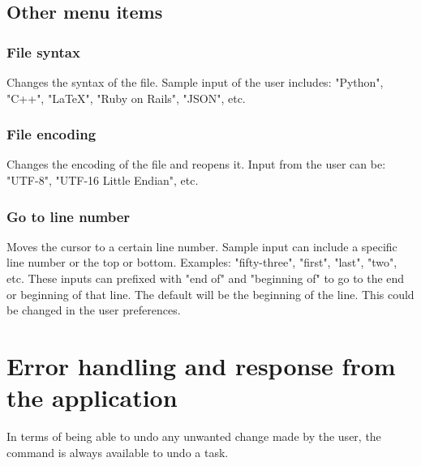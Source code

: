 \documentclass[11pt, oneside]{article}
\begin{document}
\subsection{Other menu items}

	\subsubsection{File syntax \hfill {}}
	Changes the syntax of the file. Sample input of the user includes: "Python", "C++", "\LaTeX", "Ruby on Rails", "JSON", etc.

	\subsubsection{File encoding \hfill {}}
	Changes the encoding of the file and reopens it. Input from the user can be: "UTF-8", "UTF-16 Little Endian", etc.

	\subsubsection{Go to line number \hfill {}}
	Moves the cursor to a certain line number. Sample input can include a specific line number or the top or bottom. Examples: "fifty-three", "first", "last", "two", etc. These inputs can prefixed with "end of" and "beginning of" to go to the end or beginning of that line. The default will be the beginning of the line. This could be changed in the user preferences.

\section{Error handling and response from the application}

In terms of being able to undo any unwanted change made by the user, the command  is always available to undo a task.
\end{document}
